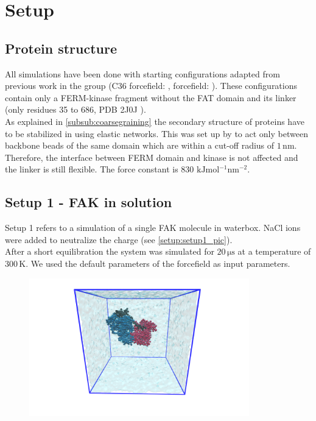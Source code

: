 \chapter{Setup}
\section{Protein structure}
All simulations have been done with starting configurations adapted from previous work in the group (C36 forcefield: \textcite{pap003}, \martini{} forcefield: \textcite{sara}). These configurations contain only a FERM-kinase fragment without the FAT domain and its linker (only residues 35 to 686, PDB 2J0J \autocite{structFAK}).\\
As explained in \autoref{subsub:coarsegraining} the secondary structure of proteins have to be stabilized in \martini{} using elastic networks. This was set up by \textcite{sara} to act only between backbone beads of the same domain which are within a cut-off radius of $1\,\si{\nano\metre}$. Therefore, the interface between FERM domain and kinase is not affected and the linker is still flexible. The force constant is 830 $\si{\kilo\joule\mole^{-1}\nano\meter^{-2}}$. 
\section{Setup 1 - FAK in solution}
\label{setup:setup1}
Setup 1 refers to a \martini{} simulation of a single FAK molecule in waterbox. NaCl ions were added to neutralize the charge (see \autoref{setup:setup1_pic}).\\
After a short equilibration the system was simulated for $20\,\si{\micro\second}$ at a temperature of $300\,\si{\kelvin}$. We used the default parameters of the \martini{} forcefield as input parameters.
%
%
%
\begin{figure}[h]
	\centering
	\includegraphics[height=6cm]{figures/setup/setup_free}
	\label{setup:setup1_pic}
\end{figure}
%
%
%

